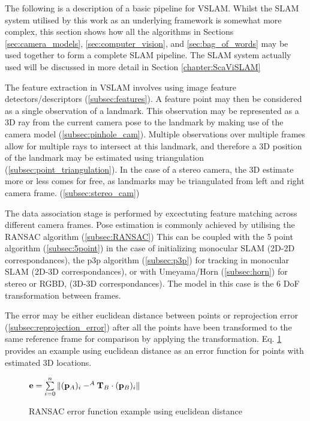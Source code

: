The following is a description of a basic pipeline for VSLAM.  Whilst the SLAM system utilised by this work as an underlying framework is somewhat more complex, this section shows how all the algorithms in Sections \ref{sec:camera_models}, \ref{sec:computer_vision}, and \ref{sec:bag_of_words} may be used together to form a complete SLAM pipeline.  The SLAM system actually used will be discussed in more detail in Section \ref{chapter:ScaViSLAM}

The feature extraction in VSLAM involves using image feature detectors/descriptors (\ref{subsec:features}).  A feature point may then be considered as a single observation of a landmark.  This observation may be represented as a 3D ray from the current camera pose to the landmark by making use of the camera model (\ref{subsec:pinhole_cam}).  Multiple observations over multiple frames allow for multiple rays to intersect at this landmark, and therefore a 3D position of the landmark may be estimated using triangulation (\ref{subsec:point_triangulation}). In the case of a stereo camera, the 3D estimate more or less comes for free, as landmarks may be triangulated from left and right camera frame. (\ref{subsec:stereo_cam})

The data association stage is performed by excectuting feature matching across different camera frames. Pose estimation is commonly achieved by utilising the RANSAC algorithm (\ref{subsec:RANSAC}) This can be coupled with the 5 point algorithm (\ref{subsec:5point}) in the case of initializing monocular SLAM (2D-2D correspondances), the p3p algorithm (\ref{subsec:p3p}) for tracking in monocular SLAM (2D-3D correspondances), or with Umeyama/Horn (\ref{subsec:horn}) for stereo or RGBD, (3D-3D correspondances). The model in this case is the 6 DoF transformation between frames. 

The error may be either euclidean distance between points or reprojection error (\ref{subsec:reprojection_error}) after all the points have been transformed to the same reference frame for comparison by applying the transformation. Eq. \ref{eq:ransac_error} provides an example using euclidean distance as an error function for points with estimated 3D locations.

\begin{figure}[h]
 \centering
 \begin{math}
  \mathbf{e} = \sum\limits_{i=0}^n \| (\mathbf p_A)_i - ^A\mathbf T_B \cdot (\mathbf p_B)_i \|
 \end{math}
 \caption{RANSAC error function example using euclidean distance}
 \label{eq:ransac_error}
\end{figure}

